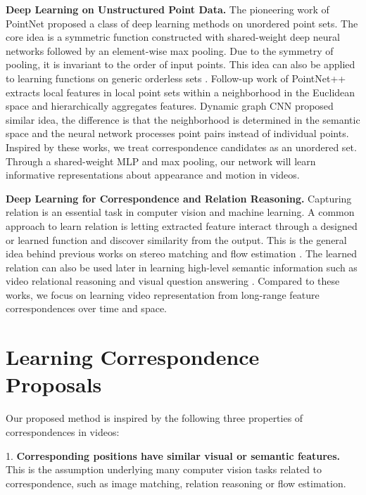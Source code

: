 \documentclass[10pt,twocolumn,letterpaper]{article}
\begin{document}
\textbf{Deep Learning on Unstructured Point Data. } The pioneering work of PointNet \cite{PointNet} proposed a class of deep learning methods on unordered point sets. The core idea is a symmetric function constructed with shared-weight deep neural networks followed by an element-wise max pooling. Due to the symmetry of pooling, it is invariant to the order of input points. This idea can also be applied to learning functions on generic orderless sets \cite{Deepset}.  
Follow-up work of PointNet++  \cite{PointNet++} extracts local features in local point sets within a neighborhood in the Euclidean space and hierarchically aggregates features. Dynamic graph CNN  \cite{Dynamic:Graph:CNN} proposed similar idea, the difference is that the neighborhood is determined in the semantic space and the neural network processes point pairs instead of individual points.
Inspired by these works, we treat correspondence candidates as an unordered set. Through a shared-weight MLP and max pooling, our network will learn informative representations about appearance and motion in videos.


\textbf{Deep Learning for Correspondence and Relation Reasoning.} Capturing relation is an essential task in computer vision and machine learning. A common approach to learn relation is letting extracted feature interact through a designed or learned function and discover similarity from the output. This is the general idea behind previous works on stereo matching \cite{Stereo:Matching:CNN:JMLR,Stereo:Matching:CNN:CVPR} and flow estimation \cite{FlowNet,FlowNet2,FlowNet3D}. The learned relation can also be used later in learning high-level semantic information such as video relational reasoning \cite{TRN} and visual question answering \cite{Relation:VQA}.
Compared to these works, we focus on learning video representation from long-range feature correspondences over time and space.





\section{Learning Correspondence Proposals}




Our proposed method is inspired by the following three properties of correspondences in videos:

1. \textbf{Corresponding positions have similar visual or semantic features.} This is the assumption underlying many computer vision tasks related to correspondence, such as image matching, relation reasoning or flow estimation.
\end{document}
